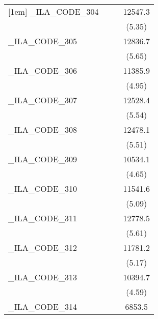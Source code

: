 {\begin{tabular}{l*{3}{c}}
[1em]
\_ILA\_CODE\_304&                     &                     &     12547.3\sym{***}\\
            &                     &                     &      (5.35)         \\
[1em]
\_ILA\_CODE\_305&                     &                     &     12836.7\sym{***}\\
            &                     &                     &      (5.65)         \\
[1em]
\_ILA\_CODE\_306&                     &                     &     11385.9\sym{***}\\
            &                     &                     &      (4.95)         \\
[1em]
\_ILA\_CODE\_307&                     &                     &     12528.4\sym{***}\\
            &                     &                     &      (5.54)         \\
[1em]
\_ILA\_CODE\_308&                     &                     &     12478.1\sym{***}\\
            &                     &                     &      (5.51)         \\
[1em]
\_ILA\_CODE\_309&                     &                     &     10534.1\sym{***}\\
            &                     &                     &      (4.65)         \\
[1em]
\_ILA\_CODE\_310&                     &                     &     11541.6\sym{***}\\
            &                     &                     &      (5.09)         \\
[1em]
\_ILA\_CODE\_311&                     &                     &     12778.5\sym{***}\\
            &                     &                     &      (5.61)         \\
[1em]
\_ILA\_CODE\_312&                     &                     &     11781.2\sym{***}\\
            &                     &                     &      (5.17)         \\
[1em]
\_ILA\_CODE\_313&                     &                     &     10394.7\sym{***}\\
            &                     &                     &      (4.59)         \\
[1em]
\_ILA\_CODE\_314&                     &                     &      6853.5\sym{**} \\

\end{tabular}}
